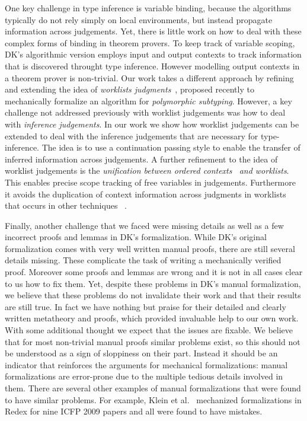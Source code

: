 One key challenge in type inference is variable binding, because the
algorithms typically do not rely simply on local environments, but
instead propagate information across judgements.  Yet, there is little
work on how to deal with these complex forms of binding in theorem
provers. To keep track of variable scoping, DK's algorithmic version
employs input and output contexts to track information that is
discovered throught type inference. However modelling output contexts
in a theorem prover is non-trivial. Our work takes a different
approach by refining and extending the idea of \emph{worklists
  judgments}~\cite{itp2018}, proposed recently to mechanically formalize an
algorithm for \emph{polymorphic subtyping}.  However, a key challenge
not addressed previously with worklist judgements was how to deal with
\emph{inference judgements}.  In our work we show how worklist
judgements can be extended to deal with the inference judgements that
are necessary for type-inference.  The idea is to use a continuation
passing style to enable the transfer of inferred information across
judgements. A further refinement to the idea of worklist judgements is
the \emph{unification between ordered contexts~\cite{gundry2010type,dunfield2013complete}
 and
  worklists}.
This enables precise scope tracking of free variables in
judgements. Furthermore it avoids the duplication of context
information across judgments in worklists that occurs in other
techniques~\cite{Reed2009,Abel2011higher}
.

Finally, another challenge that we faced were missing details as well as
a few incorrect proofs and lemmas in DK's formalization. While DK's
original formalization comes with very well written manual proofs,
there are still several details missing. These complicate the task of
writing a mechanically verified proof. Moreover some proofs and
lemmas are wrong and it is not in all cases clear to us how to fix them. Yet,
despite these problems in DK's manual formalization,
we believe that these problems do not
invalidate their work and that their results are still true. In fact we have nothing but praise for their detailed
and clearly written metatheory and proofs, which provided invaluable
help to our own work.
With some additional thought we expect that the issues
are fixable. We believe that for most non-trivial manual
proofs similar problems exist, so this should not be understood as a sign of sloppiness
on their part. Instead it should be an indicator that reinforces the arguments
for mechanical formalizations: manual formalizations are error-prone due to the multiple
tedious details involved in them.
There are several other examples of manual formalizations that were found to have
similar problems. For example, Klein et al.~\cite{KleinRunYourResearch}
 mechanized formalizations
in Redex for nine ICFP 2009 papers and all were found to have mistakes.

